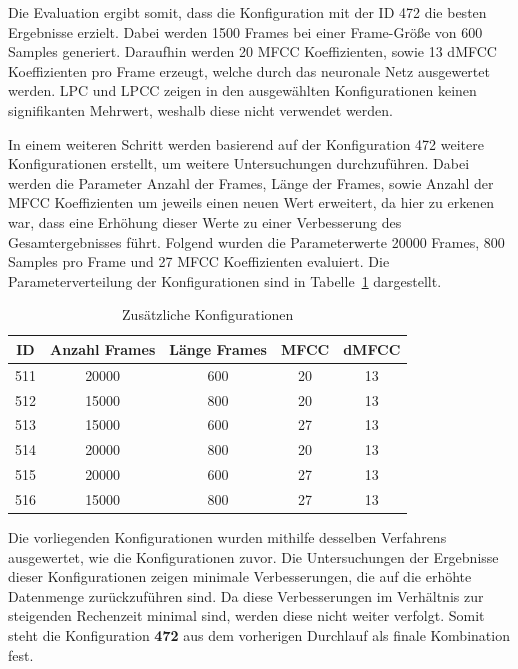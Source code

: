 Die Evaluation ergibt somit, dass die Konfiguration mit der ID 472 die besten Ergebnisse erzielt.
Dabei werden 1500 Frames bei einer Frame-Größe von 600 Samples generiert.
Daraufhin werden 20 \ac{MFCC} Koeffizienten, sowie 13 \ac{dMFCC} Koeffizienten pro Frame erzeugt, welche durch das neuronale Netz ausgewertet werden.
\ac{LPC} und \ac{LPCC} zeigen in den ausgewählten Konfigurationen keinen signifikanten Mehrwert, weshalb diese nicht verwendet werden.

In einem weiteren Schritt werden basierend auf der Konfiguration 472 weitere Konfigurationen erstellt, um weitere Untersuchungen durchzuführen.
Dabei werden die Parameter Anzahl der Frames, Länge der Frames, sowie Anzahl der \ac{MFCC} Koeffizienten um jeweils einen neuen Wert erweitert, da hier zu erkenen war, dass eine Erhöhung dieser Werte zu einer Verbesserung des Gesamtergebnisses führt.
Folgend wurden die Parameterwerte 20000 Frames, 800 Samples pro Frame und 27 \ac{MFCC} Koeffizienten evaluiert.
Die Parameterverteilung der Konfigurationen sind in Tabelle~\ref{table:additionalKonfigs} dargestellt.
\begin{table}[H]
    \centering
    \begin{tabular}{c|c|c|c|c}
    ID  & Anzahl Frames & Länge Frames & \ac{MFCC} & \ac{dMFCC} \\ \hline
    511 & 20000         & 600          & 20        & 13     \\ \hline
    512 & 15000         & 800          & 20        & 13     \\ \hline
    513 & 15000         & 600          & 27        & 13     \\ \hline
    514 & 20000         & 800          & 20        & 13     \\ \hline
    515 & 20000         & 600          & 27        & 13     \\ \hline
    516 & 15000         & 800          & 27        & 13    
    \end{tabular}
    \caption{Zusätzliche Konfigurationen}
    \label{table:additionalKonfigs}
\end{table}


Die vorliegenden Konfigurationen wurden mithilfe desselben Verfahrens ausgewertet, wie die Konfigurationen zuvor.
Die Untersuchungen der Ergebnisse dieser Konfigurationen zeigen minimale Verbesserungen, die auf die erhöhte Datenmenge zurückzuführen sind.
Da diese Verbesserungen im Verhältnis zur steigenden Rechenzeit minimal sind, werden diese nicht weiter verfolgt.
Somit steht die Konfiguration \textbf{472} aus dem vorherigen Durchlauf als finale Kombination fest.

